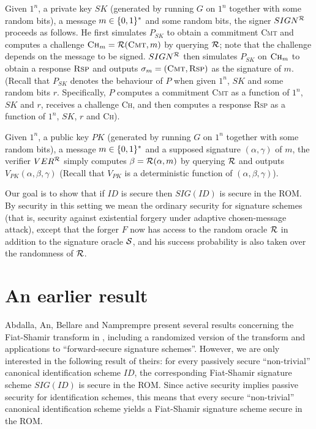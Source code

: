 Given $1^n$, a private key $SK$ (generated by running $G$ on $1^n$ together
with some random bits), a message $m \in \{0,1\}^{*}$ and some random bits, the
signer $SIGN^{\mathcal{R}}$ proceeds as follows. He first simulates $P_{SK}$ to obtain
a commitment \textsc{Cmt} and computes a challenge $\textsc{Ch}_m =
\mathcal{R}(\textsc{Cmt}, m)$ by querying $\mathcal{R}$;
note that the challenge depends on the message to be signed.  $SIGN^{\mathcal{R}}$
then simulates $P_{SK}$ on $\textsc{Ch}_m$ to obtain a response $\textsc{Rsp}$
and outputs $\sigma_m = (\textsc{Cmt},\textsc{Rsp})$ as the signature of $m$.
(Recall that $P_{SK}$ denotes the behaviour of $P$ when given $1^n$, $SK$ and
some random bits $r$. Specifically, $P$ computes a commitment
\textsc{Cmt} as a function of $1^n$, $SK$ and $r$, receives a challenge
\textsc{Ch}, and then computes a response \textsc{Rsp} as a function of $1^n$,
$SK$, $r$ and \textsc{Ch}).

Given $1^n$, a public key $PK$ (generated by running $G$ on $1^n$ together
with some random bits), a message $m \in \{0,1\}^{*}$ and a supposed signature
$(\alpha,\gamma)$ of $m$, the verifier $VER^{\mathcal{R}}$ simply computes $\beta =
\mathcal{R}(\alpha,m)$ by querying $\mathcal{R}$ and outputs
$V_{PK}(\alpha,\beta,\gamma)$ (Recall that $V_{PK}$ is a deterministic
function of $(\alpha,\beta,\gamma)$).

Our goal is to show that if $ID$ is secure then $SIG(ID)$ is secure in the
ROM. By security in this setting we mean the ordinary security for signature
schemes (that is, security against existential forgery under adaptive
chosen-message attack), except that the forger $F$ now has access to
the random oracle $\mathcal{R}$ in addition to the signature oracle $\mathcal{S}$, and
his success probability is also taken over the randomness of $\mathcal{R}$.

\section{An earlier result}
\label{SEC:OldResult}
Abdalla, An, Bellare and Namprempre present several results concerning the
Fiat-Shamir transform in \cite{abdalla:fiatshamirrom}, including a randomized
version of the transform and applications to ``forward-secure signature
schemes''. However, we are only interested in the following result of theirs:
for every passively secure ``non-trivial'' canonical identification scheme
$ID$, the corresponding Fiat-Shamir signature scheme $SIG(ID)$ is secure in
the ROM. Since active security implies passive security for identification
schemes, this means that every secure ``non-trivial'' canonical identification
scheme yields a Fiat-Shamir signature scheme secure in the ROM. 

